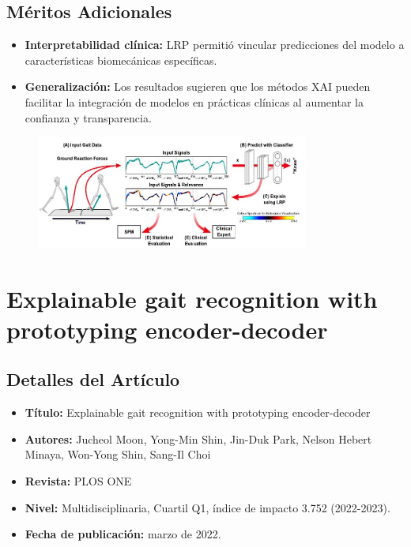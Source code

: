 \documentclass{report}
\begin{document}
\subsection{Méritos Adicionales}
\begin{itemize}
    \item \textbf{Interpretabilidad clínica:} LRP permitió vincular predicciones del modelo a características biomecánicas específicas.
    \item \textbf{Generalización:} Los resultados sugieren que los métodos XAI pueden facilitar la integración de modelos en prácticas clínicas al aumentar la confianza y transparencia.
\end{itemize}

\begin{figure}[H] 
    \centering
    \includegraphics[width=0.8\textwidth]{Images/Slijep2023_1.jpg}
\end{figure}


\section{Explainable gait recognition with prototyping encoder-decoder}

\subsection{Detalles del Artículo}
\begin{itemize}
    \item \textbf{Título:} Explainable gait recognition with prototyping encoder-decoder
    \item \textbf{Autores:} Jucheol Moon, Yong-Min Shin, Jin-Duk Park, Nelson Hebert Minaya, Won-Yong Shin, Sang-Il Choi
    \item \textbf{Revista:} PLOS ONE
    \item \textbf{Nivel:} Multidisciplinaria, Cuartil Q1, índice de impacto 3.752 (2022-2023).
    \item \textbf{Fecha de publicación:} marzo de 2022.
\end{itemize}
\end{document}
